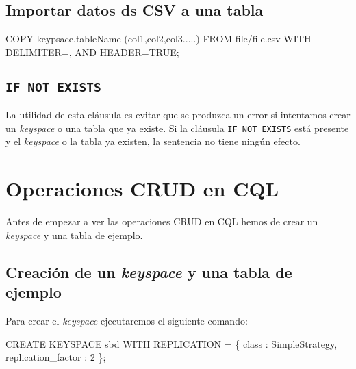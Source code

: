 \documentclass[
]{book}
\newenvironment{Shaded}{}{}
\newcommand{\NormalTok}[1]{#1}
\begin{document}
\subsection{Importar datos ds CSV a una tabla}\label{importar-datos-ds-csv-a-una-tabla}

\begin{Shaded}
\begin{Highlighting}[]
\NormalTok{COPY keypsace.tableName (col1,col2,col3.....) FROM \textquotesingle{}file/file.csv\textquotesingle{} WITH DELIMITER=\textquotesingle{},\textquotesingle{} AND HEADER=TRUE;}
\end{Highlighting}
\end{Shaded}

\subsection{\texorpdfstring{\texttt{IF\ NOT\ EXISTS}}{IF NOT EXISTS}}\label{if-not-exists}

La utilidad de esta cláusula es evitar que se produzca un error si intentamos crear un \emph{keyspace} o una tabla que ya existe. Si la cláusula \texttt{IF\ NOT\ EXISTS} está presente y el \emph{keyspace} o la tabla ya existen, la sentencia no tiene ningún efecto.

\section{Operaciones CRUD en CQL}\label{operaciones-crud-en-cql}

Antes de empezar a ver las operaciones CRUD en CQL hemos de crear un \emph{keyspace} y una tabla de ejemplo.

\subsection{\texorpdfstring{Creación de un \emph{keyspace} y una tabla de ejemplo}{Creación de un keyspace y una tabla de ejemplo}}\label{creaciuxf3n-de-un-keyspace-y-una-tabla-de-ejemplo}

Para crear el \emph{keyspace} ejecutaremos el siguiente comando:

\begin{Shaded}
\begin{Highlighting}[]
\NormalTok{CREATE KEYSPACE sbd}
\NormalTok{  WITH REPLICATION = \{ \textquotesingle{}class\textquotesingle{} : \textquotesingle{}SimpleStrategy\textquotesingle{}, \textquotesingle{}replication\_factor\textquotesingle{} : 2 \};}
\end{Highlighting}
\end{Shaded}
\end{document}
